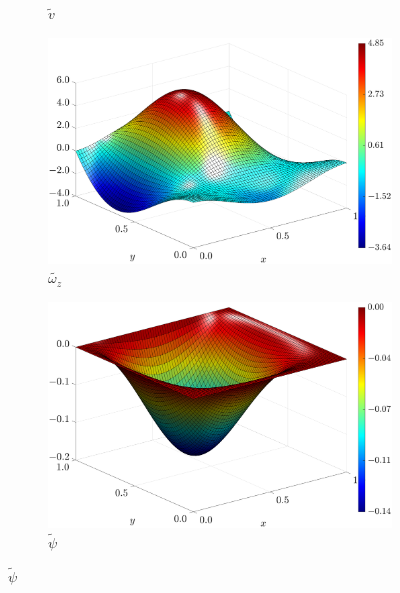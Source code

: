 \begin{figure}[H]
\begin{subfigure}[b]{.47\textwidth}
            \caption{$\widetilde{v}$\label{fig_solexavCase1}}
        \end{subfigure}
        \begin{subfigure}[b]{.47\textwidth}
            \includegraphics[width=\textwidth]{figures/Case12/UCM/Solutions/Exact_Surf_NormErr_2nd_Betann_0.1_Re_1_Wi_1_epsilon_0_xi_0_alphaG_0_Dt_1e-06_at_0.05_tipsim_1_MMS_12_Wz.eps}
            \caption{$\widetilde{\omega_{z}}$\label{fig_solexawzCase1}}
        \end{subfigure}
        \vspace{0.2cm}
        \begin{subfigure}[b]{.47\textwidth}
            \includegraphics[width=\textwidth]{figures/Case12/UCM/Solutions/Exact_Surf_NormErr_2nd_Betann_0.1_Re_1_Wi_1_epsilon_0_xi_0_alphaG_0_Dt_1e-06_at_0.05_tipsim_1_MMS_12_Psi.eps}
            \caption{$\widetilde{\psi}$\label{fig_solexapsiCase1}}
        \end{subfigure}
        \fdadospesquisa
\end{figure}


